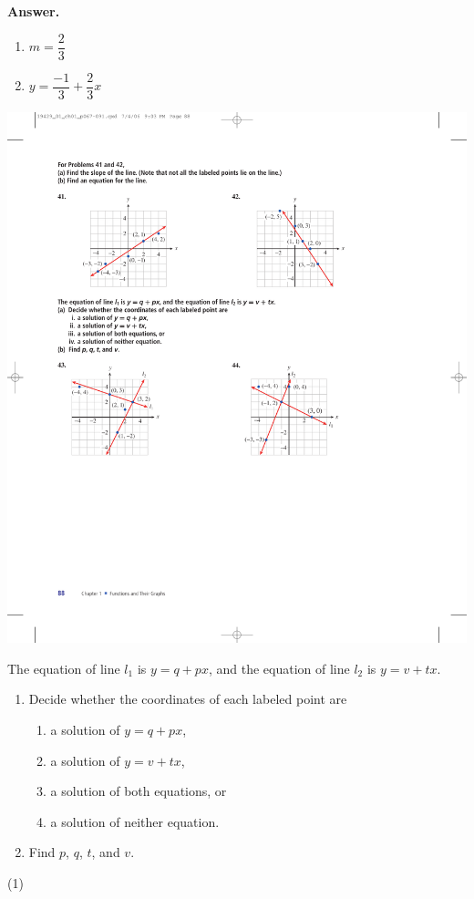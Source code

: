 \documentclass[10pt,]{book}
\theoremstyle{plain}
\theoremstyle{definition}
\theoremstyle{definition}
\theoremstyle{definition}
\theoremstyle{definition}
\numberwithin{equation}{part}
\begin{document}
\begin{exerciselist}
\begin{exercisegroup}
%
\par\smallskip
\noindent\textbf{Answer.}\hypertarget{answer-184}{}\quad
\leavevmode%
\begin{enumerate}[label=*\alph**]
\item\hypertarget{li-1229}{}\(m =\dfrac{2}{3}\)%
\item\hypertarget{li-1230}{}\(y=\dfrac{-1}{3}+ \dfrac{2}{3}x\)%
\end{enumerate}
%
\exercise[42.]\hypertarget{exercise-328}{}\includegraphics[width=0.5\linewidth]{images/fig-ex-1-5-42}
%
\end{exercisegroup}
\par\smallskip\noindent
\hypertarget{exercisegroup-42}{}\par\noindent The equation of line \(l_1\) is \(y = q + px\), and the equation of line \(l_2\) is \(y = v + tx\). \leavevmode%
\begin{enumerate}[label=*\alph**]
\item\hypertarget{li-1231}{}Decide whether the coordinates of each labeled point are %
\begin{enumerate}[label=*\roman**]
\item\hypertarget{li-1232}{}a solution of \(y = q + px\),%
\item\hypertarget{li-1233}{}a solution of \(y = v + tx\),%
\item\hypertarget{li-1234}{}a solution of both equations, or%
\item\hypertarget{li-1235}{}a solution of neither equation.%
\end{enumerate}
%
\item\hypertarget{li-1236}{}Find \(p\), \(q\), \(t\), and \(v\).%
\end{enumerate}
%
\begin{exercisegroup}(1)

\end{exercisegroup}
\end{exerciselist}
\end{document}
